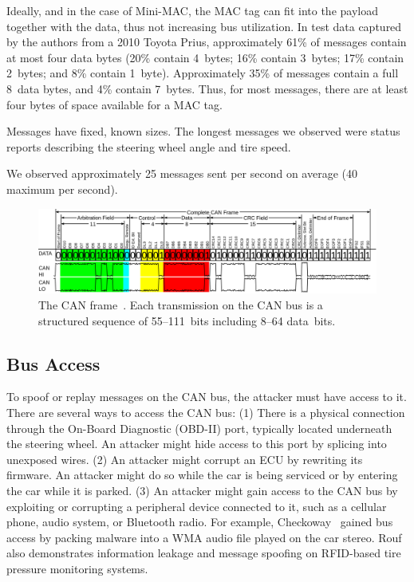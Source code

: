 Ideally, and in the case of Mini-MAC, the MAC tag
can fit into the payload together with the data, thus not increasing bus utilization. 
In test data captured by the authors from a 2010 Toyota Prius, 
approximately 61\% of messages contain at most four data bytes
(20\% contain 4~bytes; 16\% contain 3~bytes; 17\% contain 2~bytes; and 8\% contain 1~byte).
Approximately 35\% of messages contain a full 8~data bytes, and 4\% contain 7~bytes.
Thus, for most messages, there are at least four bytes of space available for a MAC tag.

Messages have fixed, known sizes.  The longest messages we observed were 
status reports describing the steering wheel angle and tire speed.

We observed approximately 25 messages sent per second on average (40 maximum per second).


	\begin{figure}
		\centering
		\includegraphics[width=\linewidth]{figures/can_frame.png}
		\caption{The CAN frame~\cite{fig1}.  
		Each transmission on the CAN bus is a structured sequence of 55--111~bits including 8--64 data~bits.}
		\label{fig-frame}
	\end{figure}

\subsection{Bus Access}

To spoof or replay messages on the CAN bus, the attacker must have access to it.
There are several ways to access the CAN bus:  (1) There is a
physical connection through the On-Board Diagnostic (OBD-II) port, 
typically located underneath the steering wheel.  An attacker might hide
access to this port by splicing into unexposed wires.
(2) An attacker might corrupt an ECU by rewriting its firmware. An attacker might
do so while the car is being serviced or by entering the car while it is parked.
(3) An attacker might gain access to the CAN bus by exploiting or corrupting a peripheral
device connected to it, such as a cellular phone, audio system, or Bluetooth
radio.  For example, Checkoway~\cite{Checkoway-2011} gained bus access by packing 
malware into a WMA audio file played on the car stereo. Rouf~\cite{Rouf2010} also demonstrates information leakage and message spoofing on RFID-based tire pressure monitoring systems.

